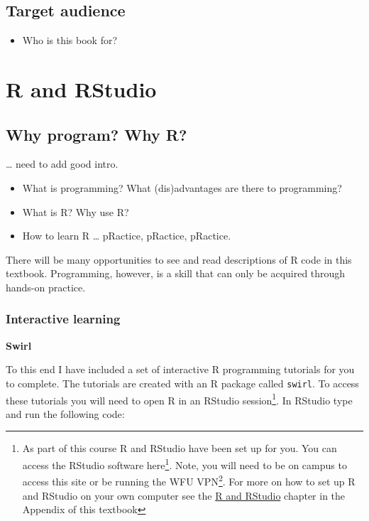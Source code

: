 \documentclass[]{book}
\renewcommand{\href}[2]{#2\footnote{\url{#1}}}
\providecommand{\tightlist}{%
  \setlength{\itemsep}{0pt}\setlength{\parskip}{0pt}}
\let\rmarkdownfootnote\footnote%
\def\footnote{\protect\rmarkdownfootnote}
\begin{document}
\hypertarget{target-audience}{%
\subsection{Target audience}\label{target-audience}}

\begin{itemize}
\tightlist
\item
  Who is this book for?
\end{itemize}

\hypertarget{r-and-rstudio}{%
\section*{R and RStudio}\label{r-and-rstudio}}

\hypertarget{why-program-why-r}{%
\subsection{Why program? Why R?}\label{why-program-why-r}}

\ldots{} need to add good intro.

\begin{itemize}
\tightlist
\item
  What is programming? What (dis)advantages are there to programming?
\item
  What is R? Why use R?
\item
  How to learn R \ldots{} pRactice, pRactice, pRactice.
\end{itemize}

There will be many opportunities to see and read descriptions of R code in this textbook. Programming, however, is a skill that can only be acquired through hands-on practice.

\hypertarget{interactive-learning}{%
\subsubsection{Interactive learning}\label{interactive-learning}}

\textbf{Swirl}

To this end I have included a set of interactive R programming tutorials for you to complete. The tutorials are created with an R package called \texttt{swirl}. To access these tutorials you will need to open R in an RStudio session\footnote{As part of this course R and RStudio have been set up for you. You can access the RStudio software \href{http://10.1.0.5/rstudio/}{here}. Note, you will need to be on campus to access this site or be running the \href{http://help.wfu.edu/vpninstall}{WFU VPN}. For more on how to set up R and RStudio on your own computer see the \protect\hyperlink{rsetup}{R and RStudio} chapter in the Appendix of this textbook}. In RStudio type and run the following code:
\end{document}
